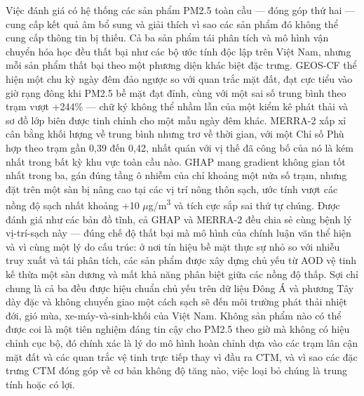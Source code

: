 Việc đánh giá có hệ thống các sản phẩm PM2.5 toàn cầu --- đóng góp thứ hai --- cung cấp kết quả âm bổ sung và giải thích vì sao các sản phẩm đó không thể cung cấp thông tin bị thiếu. Cả ba sản phẩm tái phân tích và mô hình vận chuyển hóa học đều thất bại như các bộ ước tính độc lập trên Việt Nam, nhưng mỗi sản phẩm thất bại theo một phương diện khác biệt đặc trưng. GEOS-CF thể hiện một chu kỳ ngày đêm đảo ngược so với quan trắc mặt đất, đạt cực tiểu vào giờ rạng đông khi PM2.5 bề mặt đạt đỉnh, cùng với một sai số trung bình theo trạm vượt +244\% --- chữ ký không thể nhầm lẫn của một kiểm kê phát thải và sơ đồ lớp biên được tinh chỉnh cho một mẫu ngày đêm khác. MERRA-2 xấp xỉ cân bằng khối lượng về trung bình nhưng trơ về thời gian, với một Chỉ số Phù hợp theo trạm gần 0,39 đến 0,42, nhất quán với vị thế đã công bố của nó là kém nhất trong bất kỳ khu vực toàn cầu nào. GHAP mang gradient không gian tốt nhất trong ba, gán đúng tầng ô nhiễm của chỉ khoảng một nửa số trạm, nhưng đặt trên một sàn bị nâng cao tại các vị trí nông thôn sạch, ước tính vượt các nồng độ sạch nhất khoảng +10 $\mu$g/m\textsuperscript{3} và tích cực sắp sai thứ tự chúng. Được đánh giá như các bản đồ tĩnh, cả GHAP và MERRA-2 đều chia sẻ cùng bệnh lý vị-trí-sạch này --- đúng chế độ thất bại mà mô hình của chính luận văn thể hiện và vì cùng một lý do cấu trúc: ở nơi tín hiệu bề mặt thực sự nhỏ so với nhiễu truy xuất và tái phân tích, các sản phẩm được xây dựng chủ yếu từ AOD vệ tinh kế thừa một sàn dương và mất khả năng phân biệt giữa các nồng độ thấp. Sợi chỉ chung là cả ba đều được hiệu chuẩn chủ yếu trên dữ liệu Đông Á và phương Tây dày đặc và không chuyển giao một cách sạch sẽ đến môi trường phát thải nhiệt đới, gió mùa, xe-máy-và-sinh-khối của Việt Nam. Không sản phẩm nào có thể được coi là một tiên nghiệm đáng tin cậy cho PM2.5 theo giờ mà không có hiệu chỉnh cục bộ, đó chính xác là lý do mô hình hoàn chỉnh dựa vào các trạm lân cận mặt đất và các quan trắc vệ tinh trực tiếp thay vì đầu ra CTM, và vì sao các đặc trưng CTM đóng góp về cơ bản không độ tăng nào, việc loại bỏ chúng là trung tính hoặc có lợi.

